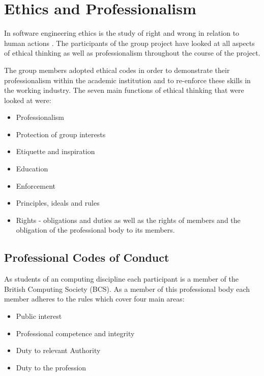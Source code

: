 \section{Ethics and Professionalism} 
\label{sec:ethics_and_professionalism}

In software engineering ethics is the study of right and wrong in relation to
human actions \citep{profissues01}. The participants of the group project have
looked at all aspects of ethical thinking as well as professionalism throughout
the course of the project.

The group members adopted ethical codes in order to demonstrate their
professionalism within the academic institution and to re-enforce these skills
in the working industry. The seven main functions of ethical thinking that were
looked at were:

\begin{itemize}
  \item Professionalism
  \item Protection of group interests
  \item Etiquette and inspiration
  \item Education
  \item Enforcement
  \item Principles, ideals and rules
  \item Rights - obligations and duties as well as the rights of members and the
        obligation of the professional body to its members. 
\end{itemize}


\subsection{Professional Codes of Conduct}

As students of an computing discipline each participant is a member of the 
British Computing Society (BCS). As a member of this professional body each 
member adheres to the rules which cover four main areas:

\begin{itemize}
  \item Public interest
  \item Professional competence and integrity
  \item Duty to relevant Authority
  \item Duty to the profession
\end{itemize}

